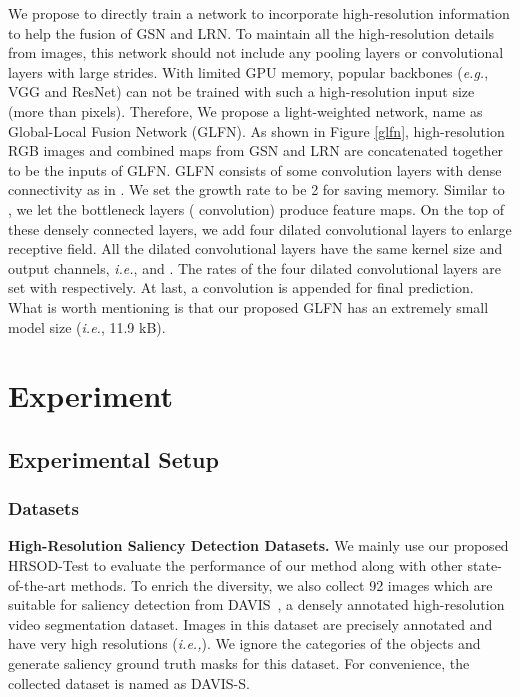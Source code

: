 \documentclass[10pt,twocolumn,letterpaper]{article}
\begin{document}
We propose to directly train a network to incorporate high-resolution information to help the fusion of GSN and LRN. To maintain all the high-resolution details from images, this network should not include any pooling layers or convolutional layers with large strides. With limited GPU memory, popular backbones (\emph{e.g.}, VGG and ResNet) can not be trained with such a high-resolution input size (more than  pixels). Therefore, We propose a light-weighted network, name as Global-Local Fusion Network (GLFN). As shown in Figure \ref{glfn}, high-resolution RGB images and combined maps from GSN and LRN are concatenated together to be the inputs of GLFN. GLFN consists of some convolution layers with dense connectivity as in \cite{huang2017densely}. We set the growth rate  to be 2 for saving memory. Similar to \cite{huang2017densely}, we let the bottleneck layers ( convolution) produce  feature maps. On the top of these densely connected layers, we add four dilated convolutional layers to enlarge receptive field. All the dilated convolutional layers have the same kernel size and output channels, \emph{i.e.},  and . The rates of the four dilated convolutional layers are set with  respectively. At last, a  convolution is appended for final prediction. What is worth mentioning is that our proposed GLFN has an extremely small model size (\emph{i.e.}, 11.9 kB). 

\section{Experiment}
\subsection{Experimental Setup}
\subsubsection{Datasets}\label{411}
\noindent\textbf{High-Resolution Saliency Detection Datasets.} We mainly use our proposed HRSOD-Test to evaluate the performance of our method along with other state-of-the-art methods. To enrich the diversity, we also collect 92 images which are suitable for saliency detection from DAVIS~\cite{perazzi2016benchmark}, a densely annotated high-resolution video segmentation dataset. Images in this dataset are precisely annotated and have very high resolutions (\emph{i.e.,}). We ignore the categories of the objects and generate saliency ground truth masks for this dataset. For convenience, the collected dataset is named as DAVIS-S.
\end{document}
